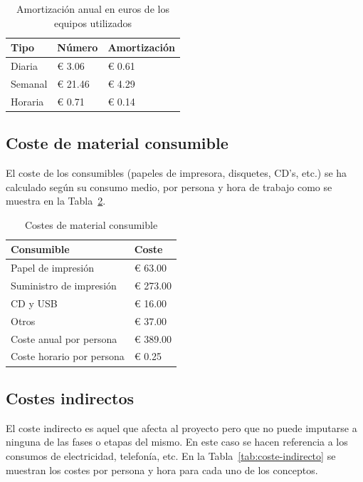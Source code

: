 \begin{table}[H]
    \centering
    \begin{tabular}{lll}
        \toprule
        Tipo    & Número  & Amortización \\
        \midrule
        Diaria  & € 3.06  & € 0.61       \\
        Semanal & € 21.46 & € 4.29       \\
        Horaria & € 0.71  & € 0.14       \\
        \bottomrule
    \end{tabular}
    \caption{Amortización anual en euros de los equipos utilizados}
    \label{tab:coste-amortizacion}
\end{table}

\subsection{Coste de material consumible}

El coste de los consumibles (papeles de impresora, disquetes, CD's, etc.) se ha calculado según su consumo medio, por persona y hora de trabajo como se muestra en la Tabla~\ref{tab:coste-consumibles}.

\begin{table}[H]
    \centering
    \begin{tabular}{ll}
        \toprule
        Consumible                & Coste    \\
        \midrule
        Papel de impresión        & € 63.00  \\
        Suministro de impresión   & € 273.00 \\
        CD y USB                  & € 16.00  \\
        Otros                     & € 37.00  \\
        \midrule
        Coste anual por persona   & € 389.00 \\
        Coste horario por persona & € 0.25   \\
        \bottomrule
    \end{tabular}
    \caption{Costes de material consumible}
    \label{tab:coste-consumibles}
\end{table}

\subsection{Costes indirectos}

El coste indirecto es aquel que afecta al proyecto pero que no puede imputarse a ninguna de las fases o etapas del mismo.
En este caso se hacen referencia a los consumos de electricidad, telefonía, etc.
En la Tabla~\ref{tab:coste-indirecto} se muestran los costes por persona y hora para cada uno de los conceptos.

